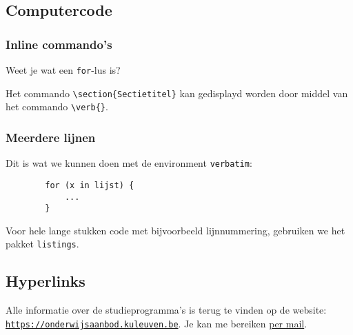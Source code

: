 \documentclass{article}
\begin{document}
	\subsection{Computercode}
	
	\subsubsection{Inline commando's}
	
	Weet je wat een \texttt{for}-lus is?
	
	Het commando \verb|\section{Sectietitel}| kan gedisplayd worden door middel van het commando \verb|\verb{}|.
	
	\subsubsection{Meerdere lijnen}
	
	Dit is wat we kunnen doen met de environment \texttt{verbatim}:
	
	\begin{verbatim}
		for (x in lijst) {
			...
		}
	\end{verbatim}
	
	Voor hele lange stukken code met bijvoorbeeld lijnnummering, gebruiken we het pakket \texttt{listings}.
	
	\subsection{Hyperlinks}
	
	Alle informatie over de studieprogramma's is terug te vinden op de website: \href{https://onderwijsaanbod.kuleuven.be}{\texttt{https://onderwijsaanbod.kuleuven.be}}. Je kan me bereiken  \href{mailto:vincent.vanschependom@student.kuleuven.be}{per mail}.
	
\end{document}
